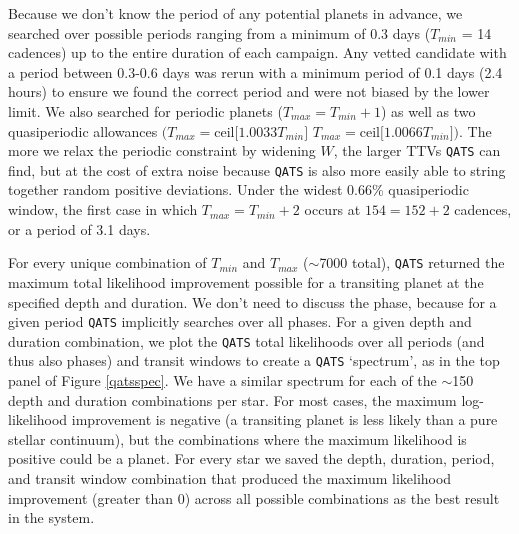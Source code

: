 \documentclass[twocolumn]{aastex62}
\newcommand{\pipeline}[1]{\texttt{#1}}
\begin{document}
Because we don't know the period of any potential planets in advance,
we searched over possible periods ranging from a minimum of 0.3 days
($T_{min}$ = 14 cadences) up to the entire duration of each campaign.
Any vetted candidate with a period between 0.3-0.6 days was rerun with
a minimum period of 0.1 days (2.4 hours) to ensure we found the
correct period and were not biased by the lower limit.  We also
searched for periodic planets ($T_{max} = T_{min} + 1$) as well as two
quasiperiodic allowances $\big( T_{max} = \text{ceil}\big[1.0033
  T_{min} \big]$  $T_{max} = \text{ceil} \big[1.0066 T_{min}
  \big] \big)$.  The more we relax the periodic constraint by widening
$W$, the larger TTVs \pipeline{QATS} can find, but at the cost of
extra noise because \pipeline{QATS} is also more easily able to string
together random positive deviations. Under the widest 0.66\%
quasiperiodic window, the first case in which $T_{max} = T_{min} + 2$
occurs at $154 = 152 + 2$ cadences, or a period of 3.1 days.

For every unique combination of $T_{min}$ and $T_{max}$ ($\sim$7000
total), \pipeline{QATS} returned the maximum total likelihood
improvement possible for a transiting planet at the specified depth
and duration.  We don't need to discuss the phase, because for a given
period \pipeline{QATS} implicitly searches over all phases.  For a
given depth and duration combination, we plot the \pipeline{QATS}
total likelihoods over all periods (and thus also phases) and transit
windows to create a \pipeline{QATS} `spectrum', as in the top panel of
Figure \ref{qatsspec}. We have a similar spectrum for each of the
$\sim$150 depth and duration combinations per star. For most cases,
the maximum log-likelihood improvement is negative (a transiting
planet is less likely than a pure stellar continuum), but the
combinations where the maximum likelihood is positive could be a
planet. For every star we saved the depth, duration, period, and
transit window combination that produced the maximum likelihood
improvement (greater than 0) across all possible combinations as the
best result in the system.
\end{document}
